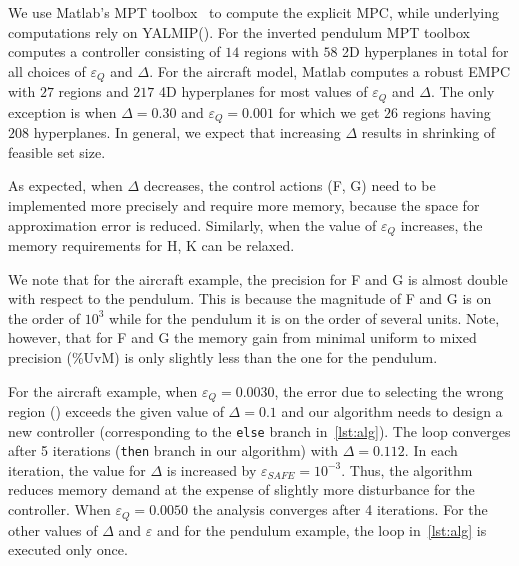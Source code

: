 
We use Matlab's MPT toolbox~\cite{matlabMPT} to compute the explicit MPC, while underlying computations rely on YALMIP(\cite{matlabYALMIP}). 
For the inverted pendulum MPT toolbox~\cite{matlabMPT} computes a controller
consisting of $14$ regions with $58$ 2D hyperplanes in total for all choices of $\varepsilon_Q$ and $\Delta$. 
For the aircraft model, Matlab computes a robust EMPC with
$27$ regions and $217$ 4D hyperplanes for most values of $\varepsilon_Q$ and $\Delta$. 
The only exception is when $\Delta=0.30$
and $\varepsilon_Q=0.001$ for which we get $26$ regions having $208$ hyperplanes.
In general, we expect that increasing $\Delta$ results in shrinking of feasible
set size.

As expected, when $\Delta$ decreases, the control actions (F, G) need to be implemented
more precisely and require more memory, because the space for approximation error
is reduced. Similarly, when the value of $\varepsilon_Q$ increases, the memory
requirements for H, K can be relaxed.

We note that for the aircraft example,
the precision for F and G is almost double with respect to the pendulum. This is
because the magnitude of F and G is on the order of $10^{3}$ while for the
pendulum it is on the order of several units. Note, however, that for F and G the memory gain
from minimal uniform to mixed precision (\%UvM) is only slightly less than the one for the pendulum.


For the aircraft example, when $\varepsilon_Q=0.0030$, the error due to selecting the wrong region (\maxUij) 
exceeds the given value of $\Delta=0.1$ and our algorithm
needs to design a new controller (corresponding to the \texttt{else} branch in~\autoref{lst:alg}). 
The loop converges after 5 iterations (\texttt{then}
branch in our algorithm) with $\Delta=0.112$. In each iteration, the value
for $\Delta$ is increased by $\varepsilon_{SAFE} = 10^{-3}$.
Thus, the algorithm reduces memory demand
at the expense of slightly more disturbance for the controller. When
$\varepsilon_Q=0.0050$ the analysis converges after 4 iterations.
For the other values of $\Delta$ and $\varepsilon$ and for the pendulum example,
the loop in~\autoref{lst:alg} is executed only once.


